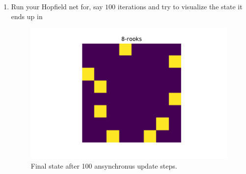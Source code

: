 \begin{enumerate}
\item Run your Hopfield net for, say $100$ iterations and try to visualize the state it ends up in
\color{blue} \\[1ex]
\begin{figure}[hb]
    \centering
    \includegraphics{Ex_03/Figures/8-rooks.pdf}
    \caption{Final state after 100 ansynchronus update steps.}
    \label{fig:my_label}
\end{figure}
\color{black}
\end{enumerate}



